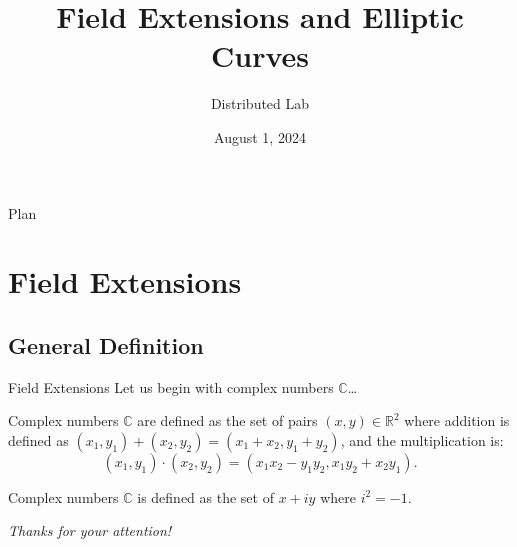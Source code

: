 \documentclass{beamer}
\title[Field Extensions and Elliptic Curves]{\textbf{Field Extensions and Elliptic Curves}}
\author{Distributed Lab}
\date{August 1, 2024}
\begin{document}
    \frame {
      \titlepage
    }
  
    \begin{frame}{Plan}
      \tableofcontents
    \end{frame}

    \section{Field Extensions}

    \subsection{General Definition}

    \begin{frame}{Field Extensions}
        Let us begin with complex numbers $\mathbb{C}$\ldots

        \begin{definition}
            Complex numbers $\mathbb{C}$ are defined as the set of pairs $(x,y) \in \mathbb{R}^2$ where addition is defined as $(x_1,y_1)+(x_2,y_2)=(x_1+x_2,y_1+y_2)$, and the multiplication is:
            \begin{equation}
                (x_1,y_1) \cdot (x_2,y_2) = (x_1x_2-y_1y_2,x_1y_2+x_2y_1).
            \end{equation}
        \end{definition}

        \begin{definition}
            Complex numbers $\mathbb{C}$ is defined as the set of $x+iy$ where $i^2=-1$.
        \end{definition}
    \end{frame}

    \begin{frame}{}
        \centering \Large
        \emph{Thanks for your attention!}
      \end{frame}
\end{document}
